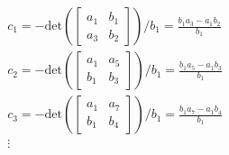 \documentclass[twoside]{article}
\begin{document}
\begin{align*}
& c_1 = - \mathrm{det}\left( \left[ \begin{array}{cc} a_1 & b_1 \\ a_3
                                                         &
                                                           b_2 \end{array}
                                                           \right]
                                                           \right) / b_1
=
\frac{b_1 a_3 - a_1 b_2 }{b_1}
\\
&c_2 = - \mathrm{det}\left( \left[ \begin{array}{cc} a_1 & a_5 \\ b_1
                                                         &
                                                           b_3 \end{array}
                                                           \right]
                                                           \right) / b_1
=
\frac{b_1 a_5 - a_1 b_3 }{b_1}
\\
&c_3 = - \mathrm{det}\left( \left[ \begin{array}{cc} a_1 & a_7 \\ b_1
                                                         &
                                                           b_4 \end{array}
                                                           \right]
                                                           \right) / b_1
=
\frac{b_1 a_7 - a_1 b_4 }{b_1}
\\
&\vdots
\end{align*}  
\end{document}
